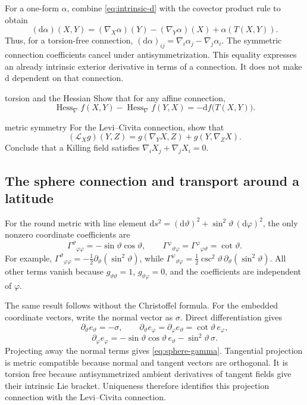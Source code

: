 \documentclass[11pt,a4paper]{article}
\numberwithin{equation}{section}
\newcommand{\dd}{\mathrm d}
\newcommand{\Lie}{\mathcal L}
\begin{document}
For a one-form \(\alpha\), combine \eqref{eq:intrinsic-d} with the
covector product rule to obtain
\begin{equation}
 (\dd\alpha)(X,Y)=(\nabla_X\alpha)(Y)-(\nabla_Y\alpha)(X)
                    +\alpha(T(X,Y)).
 \label{eq:d-and-connection}
\end{equation}
Thus, for a torsion-free connection,
\((\dd\alpha)_{ij}=\nabla_i\alpha_j-\nabla_j\alpha_i\).
The symmetric connection coefficients cancel under antisymmetrization.
This equality expresses an already intrinsic exterior derivative in terms
of a connection. It does not make \(\dd\) dependent on that connection.

\Needspace{5.5cm}
\begin{studentwork}[3.0cm]{torsion and the Hessian}
Show that for any affine connection,
\[
 \operatorname{Hess}_\nabla f(X,Y)-\operatorname{Hess}_\nabla f(Y,X)
 =-\dd f\bigl(T(X,Y)\bigr).
\]
\end{studentwork}

\Needspace{5.8cm}
\begin{studentwork}[3.2cm]{metric symmetry}
For the Levi--Civita connection, show that
\[
 (\Lie_Xg)(Y,Z)=g(\nabla_YX,Z)+g(Y,\nabla_ZX).
\]
Conclude that a Killing field satisfies \(\nabla_iX_j+\nabla_jX_i=0\).
\end{studentwork}

\subsection{The sphere connection and transport around a latitude}
\label{sec:sphere-transport}

For the round metric with line element
\(\dd s^2=(\dd\vartheta)^2+\sin^2\vartheta\,(\dd\varphi)^2\), the only nonzero
coordinate coefficients are
\begin{equation}
 \Gamma^\vartheta{}_{\varphi\varphi}=-\sin\vartheta\cos\vartheta,
 \qquad
 \Gamma^\varphi{}_{\vartheta\varphi}
 =\Gamma^\varphi{}_{\varphi\vartheta}=\cot\vartheta.
 \label{eq:sphere-gamma}
\end{equation}
For example,
\(\Gamma^\vartheta{}_{\varphi\varphi}
=-\tfrac12\partial_\vartheta(\sin^2\vartheta)\), while
\(\Gamma^\varphi{}_{\vartheta\varphi}
=\tfrac12\csc^2\vartheta\,\partial_\vartheta(\sin^2\vartheta)\).
All other terms vanish because \(g_{\vartheta\vartheta}=1\),
\(g_{\vartheta\varphi}=0\), and the coefficients are independent of
\(\varphi\).

The same result follows without the Christoffel formula. For the embedded
coordinate vectors, write the normal vector as \(\sigma\). Direct
differentiation gives
\[
 \partial_\vartheta e_\vartheta=-\sigma,\qquad
 \partial_\vartheta e_\varphi=\partial_\varphi e_\vartheta
 =\cot\vartheta\,e_\varphi,
\]
\[
 \partial_\varphi e_\varphi
 =-\sin\vartheta\cos\vartheta\,e_\vartheta
  -\sin^2\vartheta\,\sigma.
\]
Projecting away the normal terms gives \eqref{eq:sphere-gamma}. Tangential
projection is metric compatible because normal and tangent vectors are
orthogonal. It is torsion free because antisymmetrized ambient derivatives
of tangent fields give their intrinsic Lie bracket. Uniqueness therefore
identifies this projection connection with the Levi--Civita connection.
\end{document}
